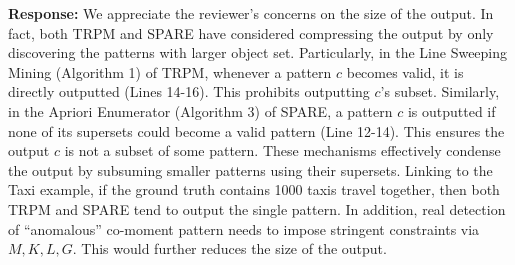 \textbf{Response:} We appreciate the reviewer's concerns on the 
size of the output. 
In fact, both TRPM and SPARE
have considered compressing the output by only discovering 
the patterns with larger object set. 
Particularly,  in the Line Sweeping Mining (Algorithm 1) of TRPM, whenever
a pattern $c$ becomes valid, it is directly outputted (Lines 14-16). This
prohibits outputting $c$'s subset. Similarly, in the Apriori Enumerator (Algorithm 3)
of SPARE, a pattern $c$ is outputted if none of its supersets could become a valid pattern (Line 12-14).
This ensures the output $c$ is not a subset of some pattern.
These mechanisms effectively condense the output by subsuming smaller
patterns using their supersets.
Linking to the Taxi example, if the ground truth contains 1000 taxis travel
together, then both TRPM and SPARE tend to output the single pattern.
In addition, real detection of ``anomalous'' co-moment pattern needs to 
impose stringent constraints via $M,K,L,G$. This would further reduces 
the size of the output.
%
%
%
